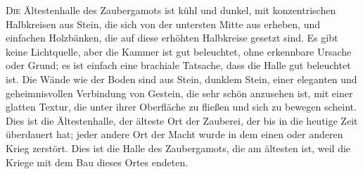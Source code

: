 
\lettrine{D}{ie} Ältestenhalle des Zaubergamots ist kühl und dunkel, mit konzentrischen Halbkreisen aus Stein, die sich von der untersten Mitte aus erheben, und einfachen Holzbänken, die auf diese erhöhten Halbkreise gesetzt sind. Es gibt keine Lichtquelle, aber die Kammer ist gut beleuchtet, ohne erkennbare Ursache oder Grund; es ist einfach eine brachiale Tatsache, dass die Halle gut beleuchtet ist. Die Wände wie der Boden sind aus Stein, dunklem Stein, einer eleganten und geheimnisvollen Verbindung von Gestein, die sehr schön anzusehen ist, mit einer glatten Textur, die unter ihrer Oberfläche zu fließen und sich zu bewegen scheint. Dies ist die Ältestenhalle, der älteste Ort der Zauberei, der bis in die heutige Zeit überdauert hat; jeder andere Ort der Macht wurde in dem einen oder anderen Krieg zerstört. Dies ist die Halle des Zaubergamots, die am ältesten ist, weil die Kriege mit dem Bau dieses Ortes endeten.

